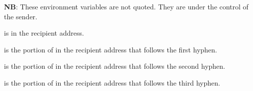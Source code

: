 \documentclass{book}
\begin{document}
\textbf{NB}: These environment variables are not quoted.  They
are under the control of the sender.


 is  in the recipient address.

 is the portion of  in the recipient
address that follows the first hyphen.

 is the portion of  in the recipient
address that follows the second hyphen.

 is the portion of  in the recipient
address that follows the third hyphen.
\end{document}
